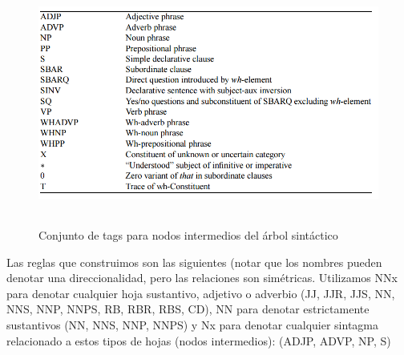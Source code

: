 \begin{figure}[H]
  \centering
    \includegraphics[width=12.823cm,height=8.004cm]{graficos/fuentes/SyntaxTags.png}
  \caption{Conjunto de tags para nodos intermedios del árbol sintáctico}
  \label{fig:syntax-tags}
\end{figure}



Las reglas que construimos son las siguientes (notar que los nombres pueden denotar una direccionalidad, pero las relaciones son simétricas.
Utilizamos NNx para denotar cualquier hoja sustantivo, adjetivo o adverbio (JJ, JJR, JJS, NN, NNS, NNP, NNPS, RB, RBR, RBS, CD), NN para denotar estrictamente sustantivos (NN, NNS, NNP, NNPS) y Nx para denotar cualquier sintagma relacionado a estos tipos de hojas (nodos intermedios): (ADJP, ADVP, NP, S)

